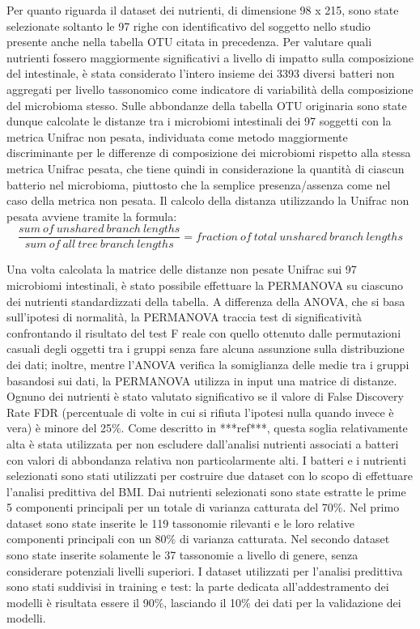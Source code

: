 Per quanto riguarda il dataset dei nutrienti, di dimensione 98 x 215, sono state selezionate soltanto le 97 righe con identificativo del soggetto nello studio presente anche nella tabella OTU citata in precedenza. 
Per valutare quali nutrienti fossero maggiormente significativi a livello di impatto sulla composizione del  intestinale, è stata considerato l’intero insieme dei 3393 diversi batteri non aggregati per livello tassonomico come indicatore di variabilità della composizione del microbioma stesso. Sulle abbondanze della tabella OTU originaria sono state dunque calcolate le distanze tra i microbiomi intestinali dei 97 soggetti con la metrica Unifrac non pesata, individuata come metodo maggiormente discriminante per le differenze di composizione dei microbiomi rispetto alla stessa metrica Unifrac pesata, che tiene quindi in considerazione la quantità di ciascun batterio nel microbioma, piuttosto che la semplice presenza/assenza come nel caso della metrica non pesata. Il calcolo della distanza utilizzando la Unifrac non pesata avviene tramite la formula: 
$$\frac{sum\: of \:unshared \:branch\: lengths}{sum\: of\: all\: tree\: branch\: lengths} = fraction\: of\: total \:unshared \:branch \:lengths$$

Una volta calcolata la matrice delle distanze non pesate Unifrac sui 97 microbiomi intestinali, è stato possibile effettuare la PERMANOVA su ciascuno dei nutrienti standardizzati della tabella. A differenza della ANOVA, che si basa sull’ipotesi di normalità, la PERMANOVA traccia test di significatività confrontando il risultato del test F reale con quello ottenuto dalle permutazioni casuali degli oggetti tra i gruppi senza fare alcuna assunzione sulla distribuzione dei dati; inoltre, mentre l'ANOVA verifica la somiglianza delle medie tra i gruppi basandosi sui dati, la PERMANOVA utilizza in input una matrice di distanze. Ognuno dei nutrienti è stato valutato significativo se il valore di False Discovery Rate FDR (percentuale di volte in cui si rifiuta l’ipotesi nulla quando invece è vera) è minore del 25\%. Come descritto in ***ref***, questa soglia relativamente alta è stata utilizzata per non escludere dall’analisi nutrienti associati a batteri con valori di abbondanza relativa non particolarmente alti.
I batteri e i nutrienti selezionati sono stati utilizzati per costruire due dataset con lo scopo di effettuare l’analisi predittiva del BMI. Dai nutrienti selezionati sono state estratte le prime 5 componenti principali per un totale di varianza catturata del 70\%. Nel primo dataset sono state inserite le 119 tassonomie rilevanti e le loro relative componenti principali con un 80\% di varianza catturata. Nel secondo dataset sono state inserite solamente le 37 tassonomie a livello di genere, senza considerare potenziali livelli superiori. I dataset utilizzati per l’analisi predittiva sono stati suddivisi in training e test: la parte dedicata all’addestramento dei modelli è risultata essere il 90\%, lasciando il 10\% dei dati per la validazione dei modelli.


